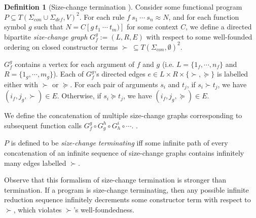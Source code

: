 \documentclass{article}
\theoremstyle{definition}
\newtheorem{definition}[theorem]{Definition}
\begin{document}
\begin{definition}[Size-change termination \cite{lee2001sizechange,thiemann2005sizechange}]
    Consider some functional program $P \subseteq T(\Sigma_{con} \cup \Sigma_{def}, V)^2$. For each rule $f ~ s_1 ~ \cdots ~ s_n \approx N$, and for each function symbol $g$ such that $N = C[g ~ t_1 ~ \cdots ~ t_m)]$ for some context $C$, we define a directed bipartite \emph{size-change graph} $G_f^g := (L, R, E)$ with respect to some well-founded ordering on closed constructor terms $\succ ~ \subseteq T(\Sigma_{con}, \emptyset)^2$.

    $G_f^g$ contains a vertex for each argument of $f$ and $g$ (i.e. $L = \{1_f, \cdots, n_f\}$ and $R = \{1_g, \cdots, m_g\}$). Each of $G_f^g$'s directed edges $e \in L \times R \times \{\succ, \succeq\}$ is labelled either with $\succ$ or $\succeq$. For each pair of arguments $s_i$ and $t_j$, if $s_i \succ t_j$, we have $(i_f, j_g, \succ) \in E$. Otherwise, if $s_i \succeq t_j$, we have $(i_f, j_g, \succeq) \in E$.

    We define the concatenation of multiple size-change graphs corresponding to subsequent function calls $G_f^g \circ G_g^h \circ G_h^i \circ \cdots$. .

   $P$ is defined to be \emph{size-change terminating} iff some infinite path of every concatenation of an infinite sequence of size-change graphs contains infinitely many edges labelled $\succ$.
\end{definition}
Observe that this formalism of size-change termination is stronger than termination. If a program is size-change terminating, then any possible infinite reduction sequence infinitely decrements some constructor term with respect to $\succ$, which violates $\succ$'s well-foundedness.
\end{document}
